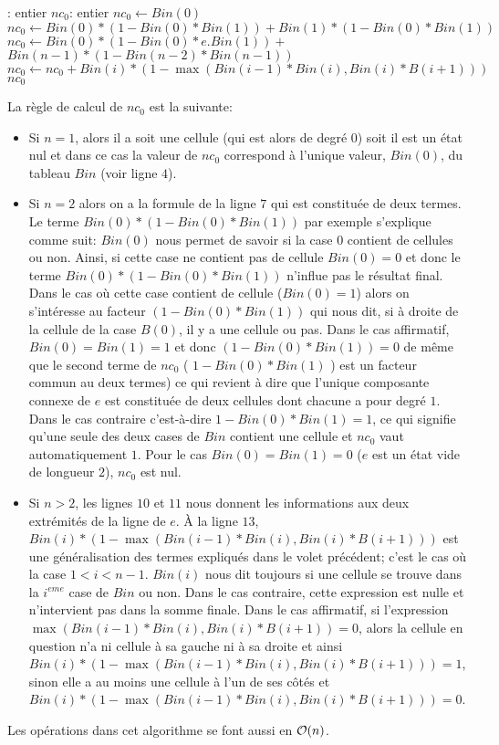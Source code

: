 \begin{algorithmic}[1]
 : entier
   \State  $nc_{0}$: entier
      \State  $nc_{0}\leftarrow Bin(0)$
   \EndIf  
      \State $nc_{0}\leftarrow Bin(0)*\left(1-Bin(0)*Bin(1)\right)+ Bin(1)*(1-Bin(0)*Bin(1))$
   \EndIf
      \State $nc_{0}\leftarrow Bin(0)*\left(1-Bin(0)*e.Bin(1)\right)+$   
      \State $ Bin(n -1)*(1-Bin(n-2)*Bin(n-1))$
      \State $nc_{0}\leftarrow  nc_{0}+Bin(i)*(1-\max(Bin(i-1)*Bin(i),Bin(i)*B(i+1)))$
      \EndFor
   \EndIf
    \State \Return $nc_{0}$
 \EndFunction
\end{algorithmic}

La règle de calcul de $nc_{0}$ est la suivante:
\begin{itemize}
\item Si $n=1$, alors il a soit une cellule (qui est alors de degré $0$) soit il est un état nul et dans ce cas la valeur de $nc_{0}$ correspond à l'unique valeur, $Bin(0)$, du tableau $Bin$ (voir ligne $4$).
\item Si $n=2$ alors on a la formule de la ligne $7$ qui est constituée de deux termes. Le terme  $Bin(0)*\left(1-Bin(0)*Bin(1)\right)$ par exemple s'explique comme suit: $Bin(0)$ nous permet de savoir si la case $0$ contient de cellules ou non. Ainsi, si cette case ne contient pas de cellule  $Bin(0)=0$ et donc le terme  $Bin(0)*\left(1-Bin(0)*Bin(1)\right)$  n'influe pas le résultat final. Dans le cas où cette case contient de cellule ($Bin(0)=1$) alors on s’intéresse au  facteur $\left(1-Bin(0)*Bin(1)\right)$ qui nous dit, si à droite de la cellule de la case $B(0)$, il y a une cellule ou pas. Dans le cas affirmatif, $Bin(0)=Bin(1)=1$ et donc $(1-Bin(0)*Bin(1))=0$ de même que le second terme de $nc_{0}$ ( $1-Bin(0)*Bin(1)$ ) est un facteur commun au deux termes) ce qui revient à dire que l'unique composante connexe de $e$ est constituée de deux cellules dont chacune a pour degré $1$. Dans le cas contraire c'est-à-dire $1-Bin(0)*Bin(1)=1$, ce qui signifie qu'une seule des deux cases de $Bin$ contient une cellule et $nc_{0}$ vaut automatiquement $1$. Pour le cas $Bin(0)=Bin(1)=0$ ($e$ est un état vide de longueur $2$), $nc_{0}$ est nul.
\item Si $n>2$, les lignes $10$ et $11$  nous donnent les informations aux deux extrémités de la ligne de $e$. À la ligne $13$, $Bin(i)*(1-\max(Bin(i-1)*Bin(i),Bin(i)*B(i+1)))$ est une généralisation des termes expliqués dans le volet précédent; c'est le cas où la case $1<i<n-1$. $Bin(i)$ nous dit toujours si une cellule se trouve dans la $i^{eme}$ case de $Bin$ ou non. Dans le cas contraire, cette expression est nulle et n'intervient pas dans la somme finale. Dans le  cas affirmatif,  si l'expression $\max(Bin(i-1)*Bin(i),Bin(i)*B(i+1))=0$, alors la cellule en question n'a ni cellule à sa gauche ni à sa droite et ainsi $Bin(i)*(1-\max(Bin(i-1)*Bin(i),Bin(i)*B(i+1)))=1$, sinon elle a au moins une cellule à l'un de ses côtés et $Bin(i)*(1-\max(Bin(i-1)*Bin(i),Bin(i)*B(i+1)))=0$.  
\end{itemize}
Les opérations dans cet algorithme se font aussi en $\mathcal{O}(n)$.

